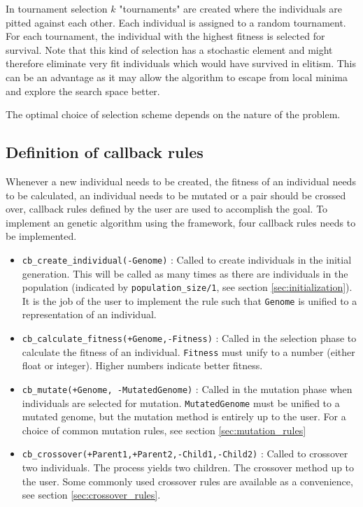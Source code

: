 \documentclass{article}
\begin{document}
In tournament selection $k$ "tournaments" are created where the individuals are pitted against each other. Each individual is assigned to a random tournament. For each tournament, the individual with the highest fitness is selected for survival. Note that this kind of selection has a stochastic element and might therefore eliminate very fit individuals which would have survived in elitism. This can be an advantage as it may allow the algorithm to escape from local minima and explore the search space better. 

The optimal choice of selection scheme depends on the nature of the problem.

\subsection{Definition of callback rules}

Whenever a new individual needs to be created, the fitness of an individual needs to be calculated, an individual needs to be mutated or a pair should be crossed over, callback rules defined by the user are used to accomplish the goal.
To implement an genetic algorithm using the framework, four callback rules needs to be implemented.

\begin{itemize}
\item \verb|cb_create_individual(-Genome)| : Called to create individuals in the initial generation. This will be called as many times as there are individuals in the population (indicated by \verb|population_size/1|, see section \ref{sec:initialization}). It is the job of the user to implement the rule such that \verb|Genome| is unified to a representation of an individual.
\item \verb|cb_calculate_fitness(+Genome,-Fitness)| : Called in the selection phase to calculate the fitness of an individual. \verb|Fitness| must unify to a number (either float or integer). Higher numbers indicate better fitness. 
\item \verb|cb_mutate(+Genome, -MutatedGenome)| : Called in the mutation phase when individuals are selected for mutation. \verb|MutatedGenome| must be unified to a mutated genome, but the mutation method is entirely up to the user. For a choice of common mutation rules, see section \ref{sec:mutation_rules}
\item \verb|cb_crossover(+Parent1,+Parent2,-Child1,-Child2)| : Called to crossover two individuals. The process yields two children. The crossover method up to the user. Some commonly used crossover rules are available as a convenience, see section \ref{sec:crossover_rules}.
\end{itemize}
\end{document}
